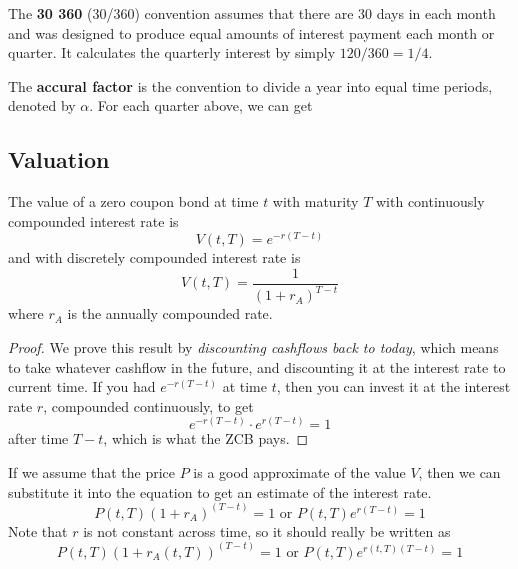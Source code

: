 \documentclass{article}
\begin{document}
      \begin{definition}[30/360]
        The \textbf{30 360} (30/360) convention assumes that there are 30 days in each month and was designed to produce equal amounts of interest payment each month or quarter. It calculates the quarterly interest by simply $120/360 = 1/4$.
      \end{definition}

      \begin{example}
        The \textbf{accural factor} is the convention to divide a year into equal time periods, denoted by $\alpha$. For each quarter above, we can get 
      \end{example}

  \subsection{Valuation}

    \begin{theorem}
      The value of a zero coupon bond at time $t$ with maturity $T$ with continuously compounded interest rate is 
      \begin{equation}
        V(t, T) = e^{-r(T-t)}
      \end{equation}
      and with discretely compounded interest rate is 
      \begin{equation}
        V(t, T) = \frac{1}{(1 + r_A)^{T - t}}
      \end{equation}
      where $r_A$ is the annually compounded rate. 
    \end{theorem}
    \begin{proof}
      We prove this result by \textit{discounting cashflows back to today}, which means to take whatever cashflow in the future, and discounting it at the interest rate to current time. If you had $e^{-r (T - t)}$ at time $t$, then you can invest it at the interest rate $r$, compounded continuously, to get 
      \begin{equation}
        e^{- r(T - t)} \cdot e^{r (T - t)} = 1
      \end{equation}
      after time $T - t$, which is what the ZCB pays. 
    \end{proof}

    If we assume that the price $P$ is a good approximate of the value $V$, then we can substitute it into the equation to get an estimate of the interest rate.  
    \begin{equation}
      P(t, T) (1 + r_A)^{(T - t)} = 1 \text{ or } P(t, T) e^{r (T - t)} = 1
    \end{equation}
    Note that $r$ is not constant across time, so it should really be written as 
    \begin{equation}
      P(t, T) (1 + r_A(t, T))^{(T - t)} = 1 \text{ or } P(t, T) e^{r(t, T) (T - t)} = 1
    \end{equation}
\end{document}

